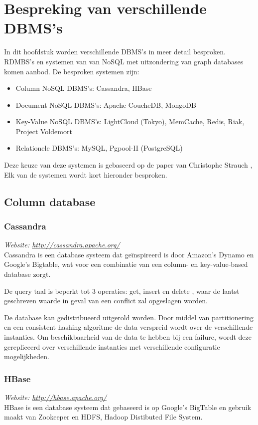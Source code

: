 \chapter{Bespreking van verschillende DBMS's}\label{sec:BesprekingDBMS}
In dit hoofdstuk worden verschillende DBMS's in meer detail besproken. RDMBS's en systemen van  van NoSQL met uitzondering van graph databases komen aanbod. De besproken systemen zijn: 
 
\begin{itemize}
\item Column NoSQL DBMS's: Cassandra, HBase
\item Document NoSQL DBMS's: Apache CoucheDB, MongoDB
\item Key-Value NoSQL DBMS's: LightCloud (Tokyo), MemCache, Redis, Riak, Project Voldemort
\item Relationele DBMS's: MySQL, Pgpool-II (PostgreSQL)
\end{itemize}

Deze keuze van deze systemen is gebaseerd op de paper van Christophe Strauch \cite{Strauch.NoSQL}, Elk van de systemen wordt kort hieronder besproken. 

\section{Column database}
\subsection{Cassandra}
\textit{Website: \url{http://cassandra.apache.org/}}\\
Cassandra is een database systeem dat geïnspireerd is door Amazon's Dynamo en Google's Bigtable, wat voor een combinatie van een column- en key-value-based database zorgt. 

De query taal is beperkt tot 3 operaties: get, insert en delete \cite{Lakshman:2010:CDS:1773912.1773922}, waar de  laatst geschreven waarde in geval van een conflict zal opgeslagen worden.

De database kan gedistribueerd uitgerold worden. Door middel van partitionering en een consistent hashing algoritme de data verspreid wordt over de verschillende instanties. Om beschikbaarheid van de data te hebben bij een failure, wordt deze gerepliceerd over verschillende instanties met verschillende configuratie mogelijkheden. 

\subsection{HBase}
\textit{Website: \url{http://hbase.apache.org/}}\\
HBase is een database systeem dat gebaseerd is op Google's BigTable en gebruik maakt van Zookeeper en HDFS, Hadoop Distibuted File System.

